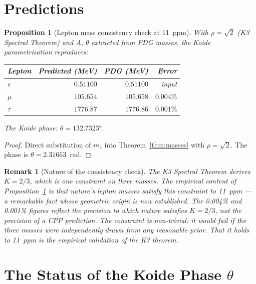 \documentclass[11pt]{article}
\newtheorem{proposition}[theorem]{Proposition}
\newtheorem{remark}{Remark}[section]
\begin{document}
\section{Predictions}

\begin{proposition}[Lepton mass consistency check at 11~ppm]
\label{prop:predictions}
With $\rho = \sqrt{2}$ (K3 Spectral Theorem) and $A$, $\theta$
extracted from PDG masses, the Koide parametrisation reproduces:
\begin{center}
\renewcommand{\arraystretch}{1.3}
\begin{tabular}{lrrr}
\toprule
Lepton & Predicted (MeV) & PDG (MeV) & Error \\
\midrule
$e$ & $0.51100$ & $0.51100$ & input \\
$\mu$ & $105.654$ & $105.658$ & $0.004\%$ \\
$\tau$ & $1776.87$ & $1776.86$ & $0.001\%$ \\
\bottomrule
\end{tabular}
\end{center}
The Koide phase: $\theta = 132.7323°$.
\end{proposition}

\begin{proof}
Direct substitution of $m_e$ into Theorem~\ref{thm:masses}
with $\rho = \sqrt{2}$.  The phase is $\theta = 2.31663$~rad.
\end{proof}

\begin{remark}[Nature of the consistency check]
The K3 Spectral Theorem derives $K = 2/3$, which is one constraint on
three masses.  The empirical content of Proposition~\ref{prop:predictions}
is that nature's lepton masses satisfy this constraint to 11~ppm --- a
remarkable fact whose geometric origin is now established.
The 0.004\% and 0.001\% figures reflect the precision to which nature
satisfies $K = 2/3$, not the precision of a CPP prediction.
The constraint is non-trivial: it would fail if the three masses were
independently drawn from any reasonable prior.  That it holds to 11~ppm
is the empirical validation of the K3 theorem.
\end{remark}

\section{The Status of the Koide Phase $\theta$}
\label{sec:theta}
\end{document}
